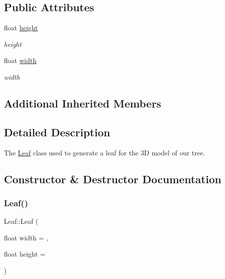 \subsection*{Public Attributes}
\begin{DoxyCompactItemize}
\item 
\mbox{\label{classLeaf_a4ae312ed546e868d9e7e72f6a9307cb4}} 
float \hyperlink{classLeaf_a4ae312ed546e868d9e7e72f6a9307cb4}{height}
\begin{DoxyCompactList}\small\item\em height \end{DoxyCompactList}\item 
\mbox{\label{classLeaf_ac3b292e68ddbf60ea185dab921fe4c68}} 
float \hyperlink{classLeaf_ac3b292e68ddbf60ea185dab921fe4c68}{width}
\begin{DoxyCompactList}\small\item\em width \end{DoxyCompactList}\end{DoxyCompactItemize}
\subsection*{Additional Inherited Members}


\subsection{Detailed Description}
The \hyperlink{classLeaf}{Leaf} class used to generate a leaf for the 3D model of our tree. 

\subsection{Constructor \& Destructor Documentation}
\mbox{\label{classLeaf_a5549ab046aab3d58145ffaf99fd5579c}} 
\subsubsection{\texorpdfstring{Leaf()}{Leaf()}}
{\footnotesize\ttfamily Leaf\+::\+Leaf (\begin{DoxyParamCaption}\item[{float}]{width = {},  }\item[{float}]{height = {} }\end{DoxyParamCaption})}



